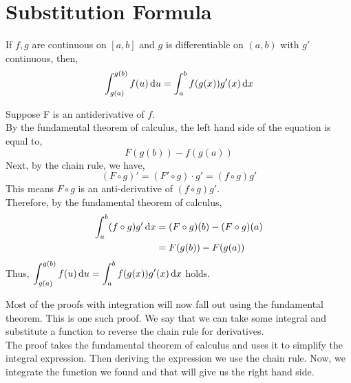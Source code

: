 \documentclass[12pt]{article}
\begin{document}
\section{Substitution Formula}
\begin{theo}{}
If \(f, g\) are continuous on \([a, b]\) and \(g\) is differentiable on \((a, b)\) with \(g'\) continuous, then,\\
\[\displaystyle\int_{g(a)}^{g(b)} f(u) \,\mathrm{d} u = \displaystyle\int_a^b f(g(x))g'(x)\,\mathrm{d} x\]    
\end{theo}
\begin{prf}{}
Suppose F is an antiderivative of \(f\).\\
By the fundamental theorem of calculus, the left hand side of the equation is equal to, 
\[F(g(b)) - f(g(a))\]
Next, by the chain rule, we have, \[(F\circ g)' = (F'\circ g)\cdot g' = (f\circ g)g'\]
This means \(F\circ g\) is an anti-derivative of \((f\circ g)g'\).\\
Therefore, by the fundamental theorem of calculus, 
\begin{align*}
\displaystyle\int_a^b (f\circ g)g'\,\mathrm{d} x &= (F\circ g)(b) - (F\circ g)(a)\\
&= F(g(b)) - F(g(a))
\end{align*}
Thus, \(\displaystyle\int_{g(a)}^{g(b)} f(u) \,\mathrm{d} u = \displaystyle\int_a^b f(g(x))g'(x)\,\mathrm{d} x\) holds.
\end{prf}
\begin{explanation}{}
    Most of the proofs with integration will now fall out using the fundamental theorem. This is one such proof. We say that we can take some integral and substitute a function to reverse the chain rule for derivatives.\\
The proof takes the fundamental theorem of calculus and uses it to simplify the integral expression. Then deriving the expression we use the chain rule. Now, we integrate the function we found and that will give us the right hand side.\\
\end{explanation}
\end{document}
